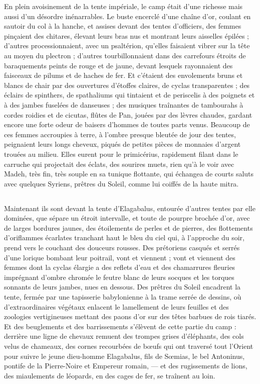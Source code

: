 \documentclass[a4paper, 11pt, oneside, polutonikogreek, french]{article}
\begin{document}
En plein avoisinement de la tente impériale, le camp était d'une richesse mais aussi d'un désordre inénarrables. Le buste encerclé d'une chaîne d'or, coulant en sautoir du col à la hanche, et assises devant des tentes d'officiers, des femmes pinçaient des chitares, élevant leurs bras nus et montrant leurs aisselles épilées ; d'autres processionnaient, avec un psaltérion, qu'elles faisaient vibrer sur la tête au moyen du plectron ; d'autres tourbillonnaient dans des carrefours étroits de baraquements peints de rouge et de jaune, devant lesquels rayonnaient des faisceaux de pilums et de haches de fer. Et c'étaient des envolements bruns et blancs de chair par des ouvertures d'étoffes claires, de cyclas transparentes ; des éclairs de spinthers, de spathaliums qui tintaient et de periscelis à des poignets et à des jambes fuselées de danseuses ; des musiques traînantes de tambourahs à cordes roidies et de cicutas, flûtes de Pan, jouées par des lèvres chaudes, gardant encore une forte odeur de baisers d'hommes de toutes parts venus. Beaucoup de ces femmes accroupies à terre, à l'ombre presque bleutée de jour des tentes, peignaient leurs longs cheveux, piqués de petites pièces de monnaies d'argent trouées au milieu. Elles eurent pour le primicérius, rapidement filant dans le carruche qui projectait des éclats, des sourires muets, rien qu'à le voir avec Madeh, très fin, très souple en sa tunique flottante, qui échangea de courts saluts avec quelques Syriens, prêtres du Soleil, comme lui coiffés de la haute mitra.
\clearpage
\subsection{}
\paragraph{}
Maintenant ils sont devant la tente d'Elagabalus, entourée d'autres tentes par elle dominées, que sépare un étroit intervalle, et toute de pourpre brochée d'or, avec de larges bordures jaunes, des étoilements de perles et de pierres, des flottements d'oriflammes écarlates tranchant haut le bleu du ciel qui, à l'approche du soir, prend vers le couchant des douceurs rousses. Des prétoriens casqués et serrés d'une lorique bombant leur poitrail, vont et viennent ; vont et viennent des femmes dont la cyclas élargie a des reflets d'eau et des chamarrures fleuries imprégnant d'ombre chromée le feutre blanc de leurs socques et les torques sonnants de leurs jambes, nues en dessous. Des prêtres du Soleil encadrent la tente, fermée par une tapisserie babylonienne à la trame serrée de dessins, où d'extraordinaires végétaux enlacent le lamellement de leurs feuilles et des zoologies vertigineuses mettant des paons d'or sur des têtes barbues de rois tiarés. Et des beuglements et des barrissements s'élèvent de cette partie du camp : derrière une ligne de chevaux remuent des trompes grises d'éléphants, des cols velus de chameaux, des cornes recourbées de bœufs qui ont traversé tout l'Orient pour suivre le jeune dieu-homme Elagabalus, fils de Sœmias, le bel Antoninus, pontife de la Pierre-Noire et Empereur romain, --- et des rugissements de lions, des miaulements de léopards, en des cages de fer, se traînent au loin.
\end{document}
